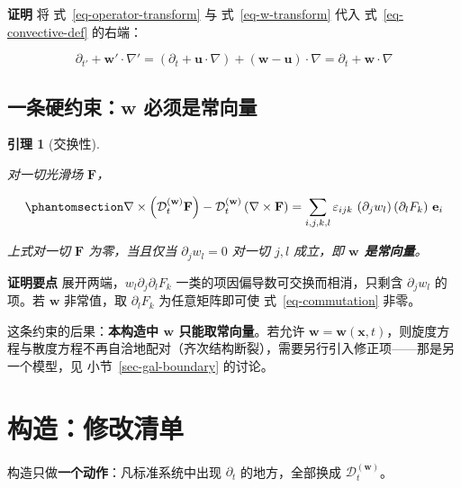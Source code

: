 \documentclass[
  chinese,
  a4paper,
  UTF8,
  12pt,
  oneside,
  openany]{ctexbook}
\theoremstyle{plain}
\theoremstyle{plain}
\theoremstyle{plain}
\theoremstyle{definition}
\theoremstyle{plain}
\theoremstyle{plain}
\newtheorem{lemma}{引理}[chapter]
\theoremstyle{remark}
\begin{document}
\textbf{证明} 将 式~\ref{eq-operator-transform} 与
式~\ref{eq-w-transform} 代入 式~\ref{eq-convective-def} 的右端：

\[
\partial_{t'} + \mathbf{w}'\cdot\nabla'
= \left(\partial_{t} + \mathbf{u}\cdot\nabla\right) + \left(\mathbf{w}-\mathbf{u}\right)\cdot\nabla
= \partial_{t} + \mathbf{w}\cdot\nabla
\]

\subsection{\texorpdfstring{一条硬约束：\(\mathbf{w}\)
必须是常向量}{一条硬约束：\textbackslash mathbf\{w\} 必须是常向量}}\label{ux4e00ux6761ux786cux7ea6ux675fmathbfw-ux5fc5ux987bux662fux5e38ux5411ux91cf}

\begin{lemma}[交换性]\protect\hypertarget{lem-commutation}{}\label{lem-commutation}

对一切光滑场 \(\mathbf{F}\)，

\begin{equation}\protect\phantomsection\label{eq-commutation}{
\nabla\times\left(\mathcal{D}_{t}^{(\mathbf{w})}\mathbf{F}\right)
- \mathcal{D}_{t}^{(\mathbf{w})}\left(\nabla\times\mathbf{F}\right)
= \sum_{i,j,k,l}\varepsilon_{ijk}\,\left(\partial_{j}w_{l}\right)\left(\partial_{l}F_{k}\right)\,\mathbf{e}_{i}
}\end{equation}

上式对一切 \(\mathbf{F}\) 为零，当且仅当 \(\partial_{j}w_{l}=0\) 对一切
\(j,l\) 成立，即 \textbf{\(\mathbf{w}\) 是常向量}。

\end{lemma}

\textbf{证明要点} 展开两端，\(w_{l}\partial_{j}\partial_{l}F_{k}\)
一类的项因偏导数可交换而相消，只剩含 \(\partial_{j}w_{l}\) 的项。若
\(\mathbf{w}\) 非常值，取 \(\partial_{l}F_{k}\) 为任意矩阵即可使
式~\ref{eq-commutation} 非零。

这条约束的后果：\textbf{本构造中 \(\mathbf{w}\) 只能取常向量}。若允许
\(\mathbf{w}=\mathbf{w}(\mathbf{x},t)\)，则旋度方程与散度方程不再自洽地配对（齐次结构断裂），需要另行引入修正项------那是另一个模型，见
小节~\ref{sec-gal-boundary} 的讨论。

\section{构造：修改清单}\label{sec-gal-construction}

构造只做\textbf{一个动作}：凡标准系统中出现 \(\partial_t\)
的地方，全部换成 \(\mathcal{D}_t^{(\mathbf{w})}\)。
\end{document}
